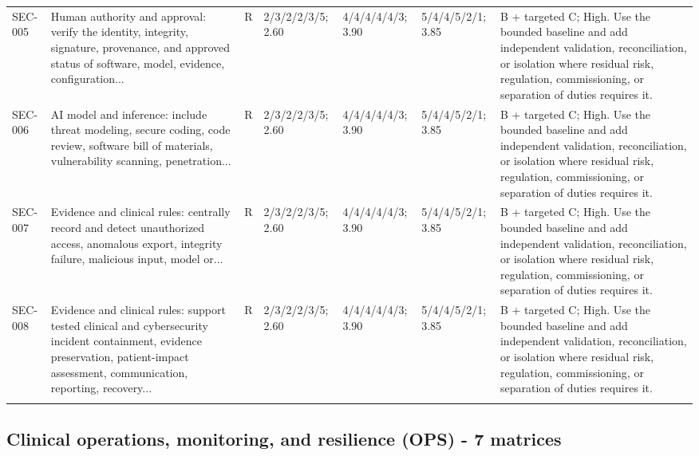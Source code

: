 \documentclass[11pt,letterpaper]{article}
\begin{document}
\begin{scriptsize}
\begin{longtable}{@{}L{0.11\textwidth}L{0.165\textwidth}L{0.04\textwidth}L{0.115\textwidth}L{0.115\textwidth}L{0.115\textwidth}L{0.235\textwidth}@{}}
\addlinespace[2pt]
SEC-005 & Human authority and approval: verify the identity, integrity, signature, provenance, and approved status of software, model, evidence, configuration... & R & 2/3/2/2/3/5; 2.60 & 4/4/4/4/4/3; 3.90 & 5/4/4/5/2/1; 3.85 & B + targeted C; High. Use the bounded baseline and add independent validation, reconciliation, or isolation where residual risk, regulation, commissioning, or separation of duties requires it. \\
\addlinespace[2pt]
SEC-006 & AI model and inference: include threat modeling, secure coding, code review, software bill of materials, vulnerability scanning, penetration... & R & 2/3/2/2/3/5; 2.60 & 4/4/4/4/4/3; 3.90 & 5/4/4/5/2/1; 3.85 & B + targeted C; High. Use the bounded baseline and add independent validation, reconciliation, or isolation where residual risk, regulation, commissioning, or separation of duties requires it. \\
\addlinespace[2pt]
SEC-007 & Evidence and clinical rules: centrally record and detect unauthorized access, anomalous export, integrity failure, malicious input, model or... & R & 2/3/2/2/3/5; 2.60 & 4/4/4/4/4/3; 3.90 & 5/4/4/5/2/1; 3.85 & B + targeted C; High. Use the bounded baseline and add independent validation, reconciliation, or isolation where residual risk, regulation, commissioning, or separation of duties requires it. \\
\addlinespace[2pt]
SEC-008 & Evidence and clinical rules: support tested clinical and cybersecurity incident containment, evidence preservation, patient-impact assessment, communication, reporting, recovery... & R & 2/3/2/2/3/5; 2.60 & 4/4/4/4/4/3; 3.90 & 5/4/4/5/2/1; 3.85 & B + targeted C; High. Use the bounded baseline and add independent validation, reconciliation, or isolation where residual risk, regulation, commissioning, or separation of duties requires it. \\
\addlinespace[2pt]
\end{longtable}
\end{scriptsize}

\subsection{Clinical operations, monitoring, and resilience (OPS) - 7 matrices}
\end{document}
